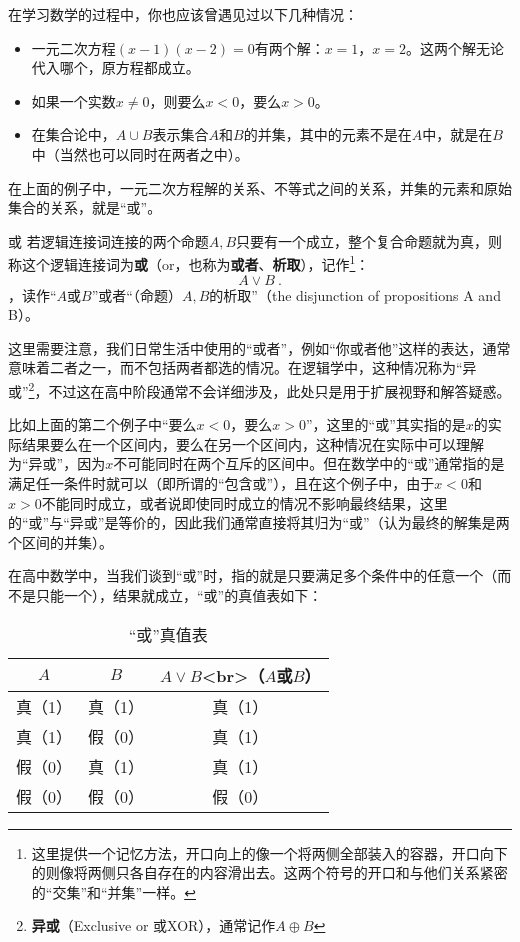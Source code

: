 在学习数学的过程中，你也应该曾遇见过以下几种情况：
\begin{itemize}
\item 一元二次方程$(x-1)(x-2)=0$有两个解：$x=1$，$x=2$。这两个解无论代入哪个，原方程都成立。
\item 如果一个实数$x\neq0$，则要么$x<0$，要么$x>0$。
\item 在集合论中，$A \cup B$表示集合$A$和$B$的并集，其中的元素不是在$A$中，就是在$B$中（当然也可以同时在两者之中）。
\end{itemize}
在上面的例子中，一元二次方程解的关系、不等式之间的关系，并集的元素和原始集合的关系，就是“或”。
\begin{definition}{或}\label{def_HsCoPr_2}
若逻辑连接词连接的两个命题$A,B$只要有一个成立，整个复合命题就为真，则称这个逻辑连接词为\textbf{或}（or，也称为\textbf{或者}、\textbf{析取}），记作\footnote{这里提供一个记忆方法，开口向上的像一个将两侧全部装入的容器，开口向下的则像将两侧只各自存在的内容滑出去。这两个符号的开口和与他们关系紧密的“交集”和“并集”一样。}：
\begin{equation}
A\lor B~.
\end{equation}
，读作“$A$或$B$”或者“（命题）$A,B$的析取”（the disjunction of propositions A and B）。
\end{definition}

这里需要注意，我们日常生活中使用的“或者”，例如“你或者他”这样的表达，通常意味着二者之一，而不包括两者都选的情况。在逻辑学中，这种情况称为“异或”\footnote{\textbf{异或}（Exclusive or 或XOR），通常记作$A\oplus B$}，不过这在高中阶段通常不会详细涉及，此处只是用于扩展视野和解答疑惑。

比如上面的第二个例子中“要么$x<0$，要么$x>0$”，这里的“或”其实指的是$x$的实际结果要么在一个区间内，要么在另一个区间内，这种情况在实际中可以理解为“异或”，因为$x$不可能同时在两个互斥的区间中。但在数学中的“或”通常指的是满足任一条件时就可以（即所谓的“包含或”），且在这个例子中，由于$x < 0$和$x > 0$不能同时成立，或者说即使同时成立的情况不影响最终结果，这里的“或”与“异或”是等价的，因此我们通常直接将其归为“或”（认为最终的解集是两个区间的并集）。

在高中数学中，当我们谈到“或”时，指的就是只要满足多个条件中的任意一个（而不是只能一个），结果就成立，“或”的真值表如下：

\begin{table}[ht]
\centering
\caption{“或”真值表}\label{tab_HsCoPr2}
\begin{tabular}{|c|c|c|}
\hline
$A$ & $B$ & $A \lor B$<br>（$A$或$B$） \\
\hline
真（1） & 真（1） & 真（1） \\
\hline
真（1） & 假（0） & 真（1） \\
\hline
假（0） & 真（1） & 真（1） \\
\hline
假（0） & 假（0） & 假（0） \\
\hline
\end{tabular}
\end{table}

